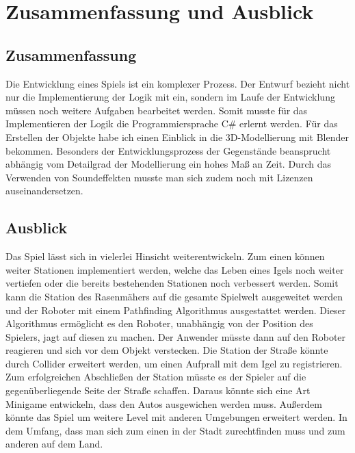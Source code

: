\chapter{Zusammenfassung und Ausblick}
\section{Zusammenfassung}
Die Entwicklung eines Spiels ist ein komplexer Prozess. Der Entwurf bezieht nicht nur die Implementierung der Logik mit ein, sondern im Laufe der Entwicklung müssen noch weitere Aufgaben bearbeitet werden. Somit musste für das Implementieren der Logik die Programmiersprache C\# erlernt werden. Für das Erstellen der Objekte habe ich einen Einblick in die 3D-Modellierung mit Blender bekommen. Besonders der Entwicklungsprozess der Gegenstände beansprucht abhängig vom Detailgrad der Modellierung ein hohes Maß an Zeit. Durch das Verwenden von Soundeffekten musste man sich zudem noch mit Lizenzen auseinandersetzen.


\section{Ausblick}
Das Spiel lässt sich in vielerlei Hinsicht weiterentwickeln. Zum einen können weiter Stationen implementiert werden, welche das Leben eines Igels noch weiter vertiefen oder die bereits bestehenden Stationen noch verbessert werden. Somit kann die Station des Rasenmähers auf die gesamte Spielwelt ausgeweitet werden und der Roboter mit einem Pathfinding Algorithmus ausgestattet werden. Dieser Algorithmus ermöglicht es den Roboter, unabhängig von der Position des Spielers, jagt auf diesen zu machen. Der Anwender müsste dann auf den Roboter reagieren und sich vor dem Objekt verstecken. Die Station der Straße könnte durch Collider erweitert werden, um einen Aufprall mit dem Igel zu registrieren. Zum erfolgreichen Abschließen der Station müsste es der Spieler auf die gegenüberliegende Seite der Straße schaffen. Daraus könnte sich eine Art Minigame entwickeln, dass den Autos ausgewichen werden muss. Außerdem könnte das Spiel um weitere Level mit anderen Umgebungen erweitert werden. In dem Umfang, dass man sich zum einen in der Stadt zurechtfinden muss und zum anderen auf dem Land.



